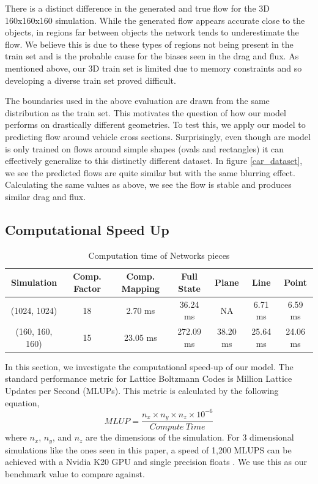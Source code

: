 \documentclass{article}
\begin{document}
There is a distinct difference in the generated and true flow for the 3D 160x160x160 simulation. While the generated flow appears accurate close to the objects, in regions far between objects the network tends to underestimate the flow. We believe this is due to these types of regions not being present in the train set and is the probable cause for the biases seen in the drag and flux. As mentioned above, our 3D train set is limited due to memory constraints and so developing a diverse train set proved difficult.

The boundaries used in the above evaluation are drawn from the same distribution as the train set. This motivates the question of how our model performs on drastically different geometries. To test this, we apply our model to predicting flow around vehicle cross sections. Surprisingly, even though are model is only trained on flows around simple shapes (ovals and rectangles) it can effectively generalize to this distinctly different dataset. In figure \ref{car_dataset}, we see the predicted flows are quite similar but with the same blurring effect. Calculating the same values as above, we see the flow is stable and produces similar drag and flux.

\subsection{Computational Speed Up}

\begin{table}[]
\small
\caption{Computation time of Networks pieces} \label{compute_times}
\centering
\begin{tabular}{|c|cccccc|}
\hline
Simulation    & Comp. Factor       & Comp. Mapping       & Full State  & Plane      & Line       & Point \\ \hline
(1024, 1024)  & 18                 & 2.70 ms            & 36.24 ms   & NA         & 6.71 ms   & 6.59 ms \\
(160, 160, 160) & 15                 & 23.05 ms           & 272.09 ms  & 38.20 ms  & 25.64 ms  & 24.06 ms  
\\ \hline
\end{tabular}
\label{computation_table}
\end{table}

In this section, we investigate the computational speed-up of our model. The standard performance metric for Lattice Boltzmann Codes is Million Lattice Updates per Second (MLUPs). This metric is calculated by the following equation,
\begin{equation}
  MLUP = \frac{n_x \times n_y \times n_z \times 10^{-6}}{Compute \ Time}
\end{equation}
 where $n_x$, $n_y$, and $n_z$ are the dimensions of the simulation. For 3 dimensional simulations like the ones seen in this paper, a speed of 1,200 MLUPS can be achieved with a Nvidia K20 GPU and single precision floats \cite{januszewski2014sailfish}. We use this as our benchmark value to compare against.
\end{document}
